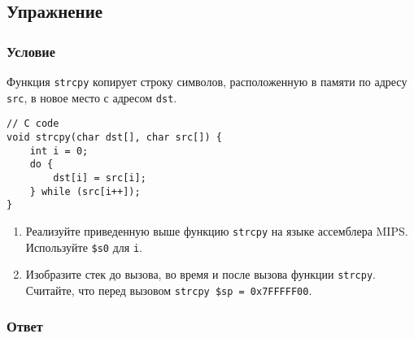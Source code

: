 \documentclass[12pt]{article}
\newenvironment{e}[1][dummy label]{
    \subsection{Упражнение}\label{#1}
    \subsubsection*{Условие}
    }{
    \subsubsection*{Ответ}
}
\begin{document}
    \begin{e}
        Функция \texttt{strcpy} копирует строку символов, расположенную в памяти по адресу \texttt{src}, в новое место с адресом \texttt{dst}.

        \begin{verbatim}
// C code
void strcpy(char dst[], char src[]) {
    int i = 0;
    do {
        dst[i] = src[i];
    } while (src[i++]);
}
        \end{verbatim}

        \begin{enumerate}
            \item Реализуйте приведенную выше функцию \texttt{strcpy} на языке ассемблера MIPS. Используйте \texttt{\$s0} для \texttt{i}.
            \item Изобразите стек до вызова, во время и после вызова функции \texttt{strcpy}. Считайте, что перед вызовом \texttt{strcpy \$sp = 0x7FFFFF00}.
        \end{enumerate}
    \end{e}
\end{document}
